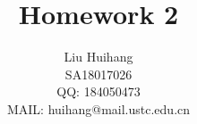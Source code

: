\title{%
Homework 2
}

\author{\name Liu Huihang  \\
        \addr SA18017026 \\
        QQ: 184050473 \\ 
        MAIL: huihang@mail.ustc.edu.cn
       }

\editor{}

\maketitle